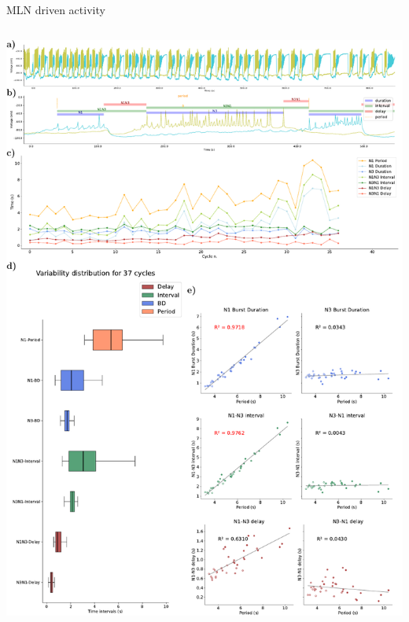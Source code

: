 \documentclass[aspectratio=43]{beamer}
\begin{document}
\begin{frame}{MLN driven activity}
	\begin{columns}
		\begin{column}{0.5\textwidth}
			\includegraphics[width=\textwidth]{invariants/data/SUSSEX/MLN_driven/images/panel_with_intervals.pdf}
		\end{column}
	\end{columns}
\end{frame}
\end{document}
